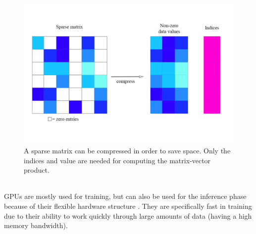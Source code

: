 \documentclass[conference]{IEEEtran}
\begin{document}
	\begin{figure}[h]
		\centering
		\includegraphics[width=\linewidth]{pictures/sparsity.png}
		\caption{A sparse matrix can be compressed in order to save space. Only the indices and value are needed for computing the matrix-vector product.}
		\label{fig:spars}
	\end{figure}
	\\
	GPUs are mostly used for training, but can also be used for the inference phase because of their flexible hardware structure \cite{capra2020updated}. They are specifically fast in training due to their ability to work quickly through large amounts of data (having a high memory bandwidth).
	\\
	
\end{document}
